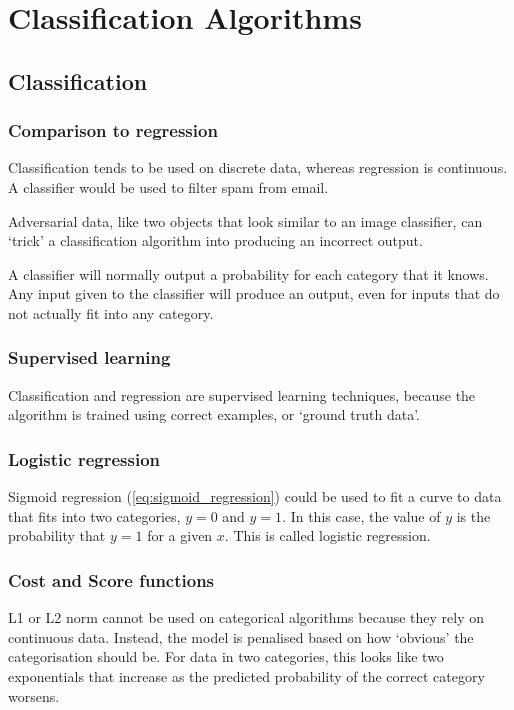 \chapter{Classification Algorithms}

\section{Classification}
\subsection{Comparison to regression}
Classification tends to be used on discrete data, whereas regression is continuous. A classifier would be used to filter spam from email.

Adversarial data, like two objects that look similar to an image classifier, can `trick' a classification algorithm into producing an incorrect output.

A classifier will normally output a probability for each category that it knows. Any input given to the classifier will produce an output, even for inputs that do not actually fit into any category.

\subsection{Supervised learning}
Classification and regression are supervised learning techniques, because the algorithm is trained using correct examples, or `ground truth data'.

\subsection{Logistic regression}
Sigmoid regression (\cref{eq:sigmoid_regression}) could be used to fit a curve to data that fits into two categories, \(y=0\) and \(y=1\). In this case, the value of \(y\) is the probability that \(y=1\) for a given \(x\). This is called logistic regression.

\subsection{Cost and Score functions}
L1 or L2 norm cannot be used on categorical algorithms because they rely on continuous data. Instead, the model is penalised based on how `obvious' the categorisation should be. For data in two categories, this looks like two exponentials that increase as the predicted probability of the correct category worsens.

